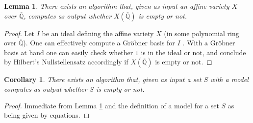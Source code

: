 \documentclass{amsproc}
\numberwithin{equation}{section}
\numberwithin{figure}{section}
\newtheorem{theorem}[equation]{Theorem}
\newtheorem{lemma}[equation]{Lemma}
\newtheorem{corollary}[equation]{Corollary}
\theoremstyle{definition}
\theoremstyle{remark}
\newcommand{\Qbar}{\overline{\mathbb{Q}}}
\DeclareMathOperator{\Bel}{Bel}
\renewcommand{\geq}{\geqslant}
\newcommand{\Belyi}{Bely\u{\i}}
\begin{document}
\begin{lemma}\label{lem:elmn}   There exists an algorithm that, given as input an affine  variety $X$ over $\Qbar$,  computes as output whether $X(\Qbar)$ is empty or not.
\end{lemma}
\begin{proof} Let $I$ be an ideal defining the affine variety $X$ (in some polynomial ring over $\Qbar$).  One can effectively compute a Gr\"obner basis for $I$ \cite[Chapter 15]{Eisenbud}. With a Gr\"obner basis at hand one can easily check whether $1$ is in the ideal or not, and conclude by Hilbert's Nullstellensatz accordingly if $X(\Qbar)$ is empty  or not.  
\end{proof}

\begin{corollary}\label{cor:elmn2}
There exists an algorithm that, given as input a set $S$ with a model computes as output whether $S$ is empty or not.
\end{corollary}
\begin{proof}
Immediate from Lemma \ref{lem:elmn} and the definition of a model for a set $S$ as being given by equations.
\end{proof}

\end{document}
